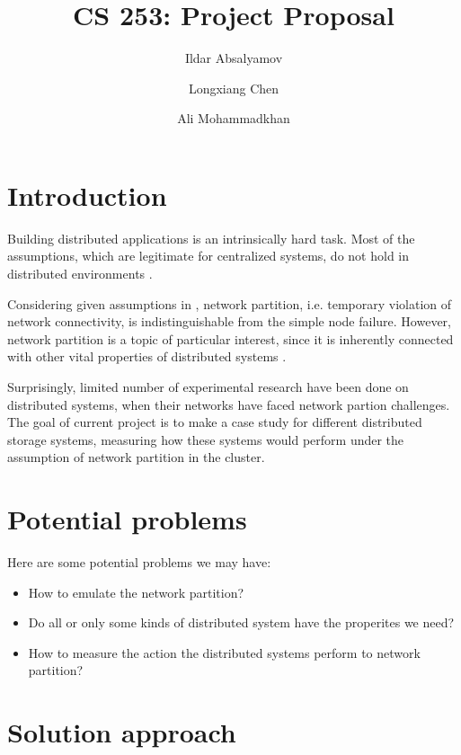 \documentclass[a4paper]{article}
\title{CS 253: Project Proposal}
\author{Ildar Absalyamov \and Longxiang Chen \and Ali Mohammadkhan}
\begin{document}
\maketitle

\section*{Introduction}

Building distributed applications is an intrinsically hard task.
Most of the assumptions, which are legitimate for centralized systems, do not hold in distributed environments \cite{deutsch1992eight}.

Considering given assumptions in \cite{deutsch1992eight}, network partition, i.e. temporary violation of network connectivity, is indistinguishable from the simple node failure. 
However, network partition is a topic of particular interest, since it is inherently connected with other vital properties of distributed systems \cite{brewer2000towards}.


Surprisingly, limited number of experimental research have been done on distributed systems, when their networks have faced network partion challenges. 
The goal of current project is to make a case study for different distributed storage systems, measuring how these systems would perform under the assumption of network partition in the cluster.

\section*{Potential problems}

Here are some potential problems we may have:

\begin{itemize}
  \item How to emulate the network partition?
  \item Do all or only some kinds of distributed system have the properites we need?
  \item How to measure the action the distributed systems perform to network partition?
\end{itemize} 

\section*{Solution approach}
\end{document}
